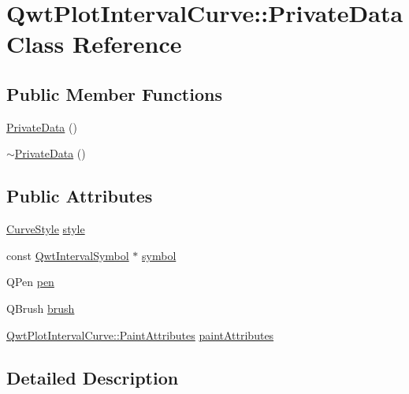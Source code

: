 \hypertarget{class_qwt_plot_interval_curve_1_1_private_data}{\section{Qwt\-Plot\-Interval\-Curve\-:\-:Private\-Data Class Reference}
\label{class_qwt_plot_interval_curve_1_1_private_data}
}
\subsection*{Public Member Functions}
\begin{DoxyCompactItemize}
\item 
\hyperlink{class_qwt_plot_interval_curve_1_1_private_data_ae3ae5dc1f141c7cf808bb57ad6571b69}{Private\-Data} ()
\item 
\hyperlink{class_qwt_plot_interval_curve_1_1_private_data_ae36b5b1cbb2346a79a852cf3a2234098}{$\sim$\-Private\-Data} ()
\end{DoxyCompactItemize}
\subsection*{Public Attributes}
\begin{DoxyCompactItemize}
\item 
\hyperlink{class_qwt_plot_interval_curve_aaef834575b923e1b317f4a86b2d97cd2}{Curve\-Style} \hyperlink{class_qwt_plot_interval_curve_1_1_private_data_aa949ee723dc3c8f7c12edc323d6db5d0}{style}
\item 
const \hyperlink{class_qwt_interval_symbol}{Qwt\-Interval\-Symbol} $\ast$ \hyperlink{class_qwt_plot_interval_curve_1_1_private_data_a3e00aac3883a2f972dee4ec100a568ff}{symbol}
\item 
Q\-Pen \hyperlink{class_qwt_plot_interval_curve_1_1_private_data_ae397038c2385d080eecd192118e4fc3c}{pen}
\item 
Q\-Brush \hyperlink{class_qwt_plot_interval_curve_1_1_private_data_a50768f4a17b1c87a464b9fc3d9303732}{brush}
\item 
\hyperlink{class_qwt_plot_interval_curve_a1fa99e81e5c1b687aec620e9b8746d6c}{Qwt\-Plot\-Interval\-Curve\-::\-Paint\-Attributes} \hyperlink{class_qwt_plot_interval_curve_1_1_private_data_a6fecb4641a25c346c24c032ae1c9e6fb}{paint\-Attributes}
\end{DoxyCompactItemize}


\subsection{Detailed Description}


